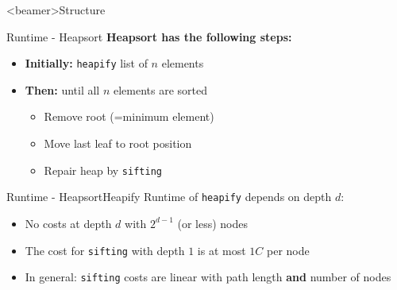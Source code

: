 \setcounter{subsubsection}{0}

\begin{frame}<beamer>{Structure}
\end{frame}


\begin{frame}{Runtime - Heapsort}
  \textbf{Heapsort has the following steps:}
  \begin{itemize}
    \item
      \textbf{Initially:} \texttt{heapify} list of $n$ elements
    \item<2- |handout:1>
    \textbf{Then:} until all $n$ elements are sorted
    \begin{itemize}
      \item<3- |handout:1>
        Remove root (=minimum element)
      \item<4- |handout:1>
        Move last leaf to root position
      \item<5- |handout:1>
        Repair heap by \texttt{sifting}
    \end{itemize}
  \end{itemize}
\end{frame}


\begin{frame}{Runtime - Heapsort}{Heapify}
  Runtime of \texttt{heapify} depends on depth {\color{MainA}$d$}:
  \begin{figure}[!h]
    \begin{adjustbox}{width=0.7\linewidth}
      
    \end{adjustbox}
    \vspace{-0.5em}
  \end{figure}
  \begin{itemize}
    \item<2- |handout:1>
      No costs at depth {\color{MainA}$d$} with {\color{MainA}$2^{d-1}$}
      (or less) nodes
    \item<3- |handout:1>
      The cost for \texttt{sifting} with depth {\color{MainA}$1$}
      is at most {\color{MainA}$1 C$} per node
    \item<4- |handout:1>
      In general: \texttt{sifting} costs are linear with path length
      \textbf{and} number of nodes
  \end{itemize}
\end{frame}

